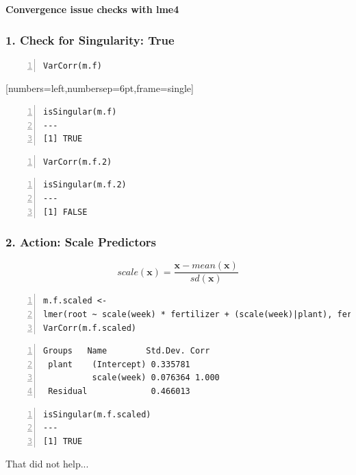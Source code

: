\documentclass{beamer}
\begin{document}
\begin{frame}[fragile]
    \huge\color{purple}\textbf{Convergence issue checks with lme4}
\end{frame}

\begin{frame}[fragile]
    \frametitle{1. Check for Singularity: True}
    \scriptsize
    \begin{Verbatim}[numbers=left,numbersep=6pt,frame=single]
VarCorr(m.f)
    \end{Verbatim}[numbers=left,numbersep=6pt,frame=single]
    \scalebox{1}{
        
    }
    \begin{Verbatim}[numbers=left,numbersep=6pt,frame=single]
isSingular(m.f)
---
[1] TRUE
    \end{Verbatim}

    \begin{Verbatim}[numbers=left,numbersep=6pt,frame=single]
VarCorr(m.f.2)
    \end{Verbatim}
    \scalebox{1}{
        
    }
    \begin{Verbatim}[numbers=left,numbersep=6pt,frame=single]
isSingular(m.f.2)
---
[1] FALSE
    \end{Verbatim}
\end{frame}

\begin{frame}[fragile]
    \frametitle{2. Action: Scale Predictors}
    \begin{equation*}
        scale(\mathbf{x}) = \frac{\mathbf{x} - mean(\mathbf{x})}{sd(\mathbf{x})}
    \end{equation*}
    \vspace{0.3cm}
    
    \scriptsize
    \begin{Verbatim}[numbers=left,numbersep=6pt,frame=single]
m.f.scaled <- 
lmer(root ~ scale(week) * fertilizer + (scale(week)|plant), fertilizer)
VarCorr(m.f.scaled) 
    \end{Verbatim}
    \begin{Verbatim}[numbers=left,numbersep=6pt,frame=single]
 Groups   Name        Std.Dev. Corr 
 plant    (Intercept) 0.335781      
          scale(week) 0.076364 1.000
 Residual             0.466013
    \end{Verbatim}

    \begin{Verbatim}[numbers=left,numbersep=6pt,frame=single]
isSingular(m.f.scaled)
---
[1] TRUE
    \end{Verbatim}
    \normalsize That did not help...
\end{frame}
\end{document}
